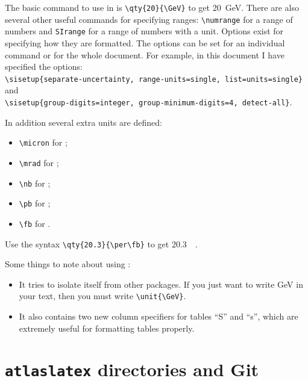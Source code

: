 The basic command to use in  is \verb|\qty{20}{\GeV}| to get
\qty{20}{\GeV}. 
There are also several other useful commands for specifying ranges:
\verb|\numrange| for a range of numbers and \verb|SIrange| for a range of numbers with a unit. 
Options exist for specifying how they are formatted.
The options can be set for an individual command or for the whole document.
For example, in this document I have specified the options:\\
\verb|\sisetup{separate-uncertainty, range-units=single, list=units=single}|
and\\
\verb|\sisetup{group-digits=integer, group-minimum-digits=4, detect-all}|.

In addition several extra units are defined:
\begin{itemize}
\item \verb|\micron| for \unit{\micron};
\item \verb|\mrad| for \unit{\mrad};
\item \verb|\nb| for \unit{\nb};
\item \verb|\pb| for \unit{\pb};
\item \verb|\fb| for \unit{\fb}.
\end{itemize}
Use the syntax \verb|\qty{20.3}{\per\fb}| to get \qty{20.3}{\per\fb}.

Some things to note about using :
\begin{itemize}
\item It tries to isolate itself from other packages.
  If you just want to write \unit{\GeV} in your text,
  then you must write \verb|\unit{\GeV}|.
\item It also contains two new column specifiers for tables ``S'' and ``s'',
  which are extremely useful for formatting tables properly.
\end{itemize}



\section{\texttt{atlaslatex} directories and Git}
\label{sec:gitsvn}

